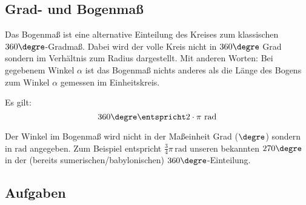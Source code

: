 
\subsection{Grad- und Bogenmaß}

Das Bogenmaß ist eine alternative Einteilung des Kreises zum
klassischen $360\degre$-Gradmaß. Dabei wird der volle Kreis nicht in
$360\degre$ Grad sondern im Verhältnis zum Radius dargestellt. Mit
anderen Worten: Bei gegebenem Winkel $\alpha$ ist das Bogenmaß nichts
anderes als die Länge des Bogens zum Winkel $\alpha$ gemessen im Einheitskreis.


Es gilt:
$$360\degre \entspricht 2\cdot\pi \textrm{\,\,rad}$$

Der Winkel im Bogenmaß wird nicht in der Maßeinheit Grad (${}\degre$)
sondern in $\textrm{rad}$ angegeben. Zum Beispiel entspricht
$\frac{3}{4}\pi\,\textrm{rad}$ unseren bekannten $270\degre$ in der
(bereits sumerischen/babylonischen) $360\degre$-Einteilung.

\subsection*{Aufgaben}
